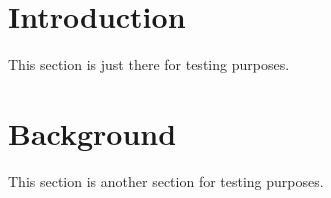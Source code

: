 \documentclass{amsart}
\begin{document}
\section{Introduction}

This section is just there for testing purposes.

\section{Background}

This section is another section for testing purposes.
\end{document}
